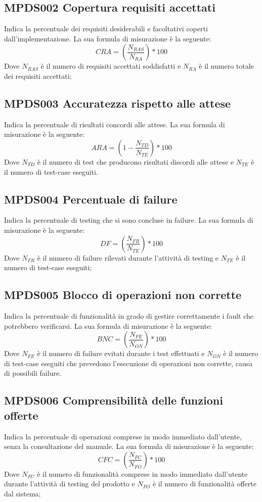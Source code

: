 \documentclass[NormeDiProgetto.tex]{subfiles}
\begin{document}
\subsection{MPDS002 Copertura requisiti accettati} Indica la percentuale dei requisiti desiderabili e facoltativi coperti dall'implementazione. La sua formula di misurazione è la seguente: \[CRA=(\frac{N_{RAS}}{N_{RA}})*100\] Dove $ N_{RAS} $ è il numero di requisiti accettati soddisfatti e $ N_{RA } $ è il numero totale dei requisiti accettati;
\subsection{MPDS003 Accuratezza rispetto alle attese} Indica la percentuale di risultati concordi alle attese. La sua formula di misurazione è la seguente: \[ARA=(1-\frac{N_{TD}}{N_{TE}})*100\] Dove $ N_{TD} $ è il numero di test che producono risultati discordi alle attese e $ N_{TE} $ è il numero di test-case eseguiti.

\subsection{MPDS004 Percentuale di failure} Indica la percentuale di testing che si sono concluse in failure. La sua formula di misurazione è la seguente: \[DF=(\frac{N_{FR}}{N_{TE}})*100\] Dove $ N_{FR} $ è il numero di failure rilevati durante l'attività di testing e $ N_{TE} $ è il numero di test-case eseguiti;
\subsection{MPDS005 Blocco di operazioni non corrette} Indica la percentuale di funzionalità in grado di gestire correttamente i fault che potrebbero verificarsi. La sua formula di misurazione è la seguente: \[BNC=(\frac{N_{FE}}{N_{ON}})*100\] Dove $ N_{FE} $ è il numero di failure evitati durante i test effettuati e $ N_{ON} $ è il numero di test-case eseguiti che prevedono l'esecuzione di operazioni non corrette, causa di possibili failure.

\subsection{MPDS006 Comprensibilità delle funzioni offerte} Indica la percentuale di operazioni comprese in modo immediato dall'utente, senza la consultazione del manuale. La sua formula di misurazione è la seguente: \[CFC=(\frac{N_{FC}}{N_{FO}})*100\] Dove $ N_{FC} $ è il numero di funzionalità comprese in modo immediato dall'utente durante l'attività di testing del prodotto e $ N_{FO} $ è il numero di funzionalità offerte dal sistema;
\end{document}
